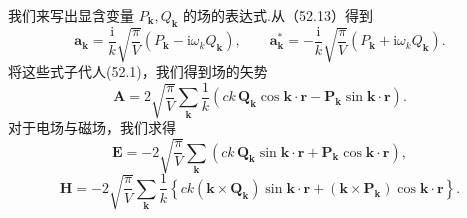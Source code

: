 我们来写出显含变量 $P_{\boldsymbol{k}},Q_{\boldsymbol{k}}$ 的场的表达式.从（52.13）得到
\begin{equation}
  \boldsymbol{a}_{\boldsymbol{k}}
  =\frac{\mathrm{i}}{k}\sqrt{\frac{\pi}{V}}
  (P_{\boldsymbol{k}}-\mathrm{i}\omega_k Q_{\boldsymbol{k}}),\qquad
  \boldsymbol{a}_{\boldsymbol{k}}^*
  =-\frac{\mathrm{i}}{k}\sqrt{\frac{\pi}{V}}
  (P_{\boldsymbol{k}}+\mathrm{i}\omega_k Q_{\boldsymbol{k}}).
\end{equation}
将这些式子代人(52.1)，我们得到场的矢势
\begin{equation}
  \boldsymbol{A}=2\sqrt{\frac{\pi}{V}}\sum_{\boldsymbol{k}}\frac{1}{k}
  (ck\,\boldsymbol{Q}_{\boldsymbol{k}}\cos\boldsymbol{k}\cdot\boldsymbol{r}
  -\boldsymbol{P}_{\boldsymbol{k}}\sin\boldsymbol{k}\cdot\boldsymbol{r}).
\end{equation}
对于电场与磁场，我们求得
\begin{equation*}
  \boldsymbol{E}=-2\sqrt{\frac{\pi}{V}}\sum_{\boldsymbol{k}}
  (ck\,\boldsymbol{Q}_{\boldsymbol{k}}\sin\boldsymbol{k}\cdot\boldsymbol{r}
  +\boldsymbol{P}_{\boldsymbol{k}}\cos\boldsymbol{k}\cdot\boldsymbol{r}),
\end{equation*}
\begin{equation}
  \boldsymbol{H}=-2\sqrt{\frac{\pi}{V}}\sum_{\boldsymbol{k}}\frac{1}{k}
  \left\{ck(\boldsymbol{k}\times\boldsymbol{Q}_{\boldsymbol{k}})
  \sin\boldsymbol{k}\cdot\boldsymbol{r}
  +(\boldsymbol{k}\times\boldsymbol{P}_{\boldsymbol{k}})
  \cos\boldsymbol{k}\cdot\boldsymbol{r}\right\}.
\end{equation}
